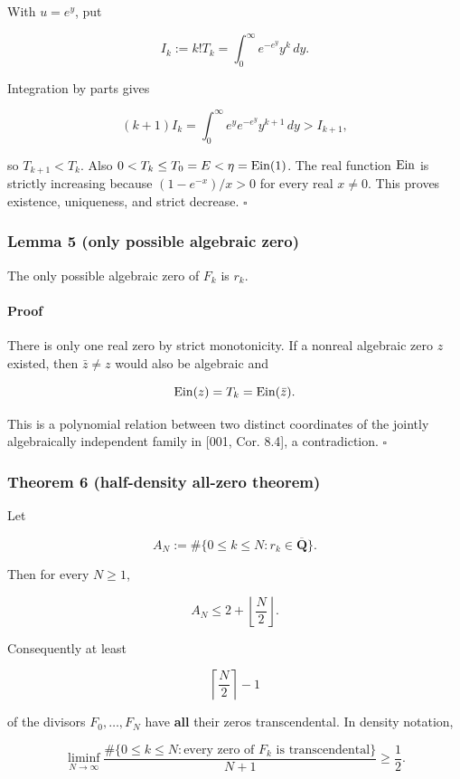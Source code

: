 With \(u=e^y\), put

\[
 I_k:=k!T_k=\int_0^\infty e^{-e^y}y^k\,dy.
\]

Integration by parts gives

\[
 (k+1)I_k
 =\int_0^\infty e^y e^{-e^y}y^{k+1}\,dy>I_{k+1},
\]

so \(T_{k+1}<T_k\). Also \(0<T_k\le T_0=E<\eta=\operatorname{Ein}(1)\).
The real function \(\operatorname{Ein}\) is strictly increasing because
\((1-e^{-x})/x>0\) for every real \(x\ne0\). This proves existence,
uniqueness, and strict decrease. \(\square\)

\subsubsection{Lemma 5 (only possible algebraic zero)}

The only possible algebraic zero of \(F_k\) is \(r_k\).

\paragraph{Proof}

There is only one real zero by strict monotonicity. If a nonreal algebraic
zero \(z\) existed, then \(\bar z\ne z\) would also be algebraic and

\[
 \operatorname{Ein}(z)=T_k=\operatorname{Ein}(\bar z).
\]

This is a polynomial relation between two distinct coordinates of the
jointly algebraically independent family in {[}001, Cor. 8.4{]}, a contradiction.
\(\square\)

\subsubsection{Theorem 6 (half-density all-zero theorem)}

Let

\[
 A_N:=\#\{0\le k\le N:r_k\in\overline{\mathbf Q}\}.
\]

Then for every \(N\ge1\),

\[
 \boxed{A_N\le2+\left\lfloor\frac N2\right\rfloor.}                         \tag{GT-13}
\]

Consequently at least

\[
 \boxed{\left\lceil\frac N2\right\rceil-1}                                 \tag{GT-14}
\]

of the divisors \(F_0,\ldots,F_N\) have \textbf{all} their zeros transcendental.
In density notation,

\[
 \liminf_{N\to\infty}
 \frac{\#\{0\le k\le N:\text{every zero of }F_k\text{ is transcendental}\}}
 {N+1}\ge\frac12.                                                           \tag{GT-15}
\]


